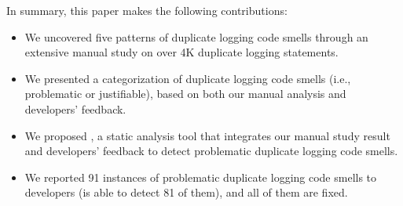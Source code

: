 In summary, this paper makes the following contributions: %
\vspace{-0.1cm}
\begin{itemize} \itemsep 0em
  \item We uncovered five patterns of duplicate logging code smells through an extensive manual study on over 4K duplicate logging statements.%



  \item We presented a categorization of duplicate logging code smells (i.e., problematic or justifiable), based on both our manual analysis %
  and developers' feedback.


  \item We proposed \tool, a static analysis tool that integrates our manual study result and developers' feedback to detect problematic duplicate logging code smells. %


  \item We reported 91 instances of problematic duplicate logging code smells to developers (\toolS is able to detect 81 of them), and all of them are fixed.




\end{itemize}
